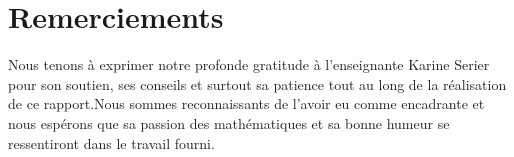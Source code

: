 \newpage

\section*{Remerciements}
Nous tenons à exprimer notre profonde gratitude à l’enseignante Karine Serier pour son soutien, ses conseils et surtout sa patience tout au long de la réalisation de ce rapport.Nous sommes reconnaissants de l’avoir eu comme encadrante et nous espérons que sa passion des mathématiques et sa bonne humeur se ressentiront dans le travail fourni.

